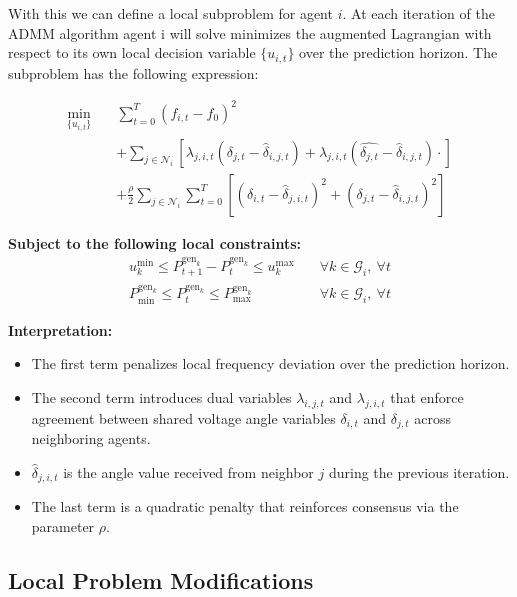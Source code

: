 \documentclass{article}
\begin{document}
With this we can define a local subproblem for agent $i$. At each iteration of the ADMM algorithm agent i will solve minimizes the augmented Lagrangian with respect to its own local decision variable $\{u_{i,t}\}$ over the prediction horizon. The subproblem has the following expression:

\begin{align}
    \min_{\{u_{i,t}\}} \quad & \sum_{t=0}^{T} (f_{i,t} - f_0)^2 \nonumber \\
    &+ \sum_{j \in \mathcal{N}_i} \left[ \lambda_{j,i,t}(\delta_{j,t} - \hat{\delta}_{i,j,t})  + \lambda_{j,i,t}(\hat{\delta_{j,t}} - \hat{\delta}_{i, j, t}) \cdot  \right] \nonumber \\
    &+ \frac{\rho}{2} \sum_{j \in \mathcal{N}_i} \sum_{t=0}^T \left[ (\delta_{i,t} - \hat{\delta}_{j,i,t})^2 + (\delta_{j,t} - \hat{\delta}_{i,j,t})^2 \right]
\end{align}

\textbf{Subject to the following local constraints:}
\begin{align}
    u^{\min}_k \leq P^{\text{gen}_k}_{t+1} - P^{\text{gen}_k}_t \leq u^{\max}_k \quad &\forall k \in \mathcal{G}_i,\ \forall t \\
    P^{\text{gen}_k}_{\min} \leq P^{\text{gen}_k}_t \leq P^{\text{gen}_k}_{\max} \quad &\forall k \in \mathcal{G}_i,\ \forall t
\end{align}

\textbf{Interpretation:}
\begin{itemize}
    \item The first term penalizes local frequency deviation over the prediction horizon.
    \item The second term introduces dual variables $\lambda_{i,j,t}$ and $\lambda_{j,i,t}$ that enforce agreement between shared voltage angle variables $\delta_{i,t}$ and $\delta_{j,t}$ across neighboring agents.
    \item $\hat{\delta}_{j,i,t}$ is the angle value received from neighbor $j$ during the previous iteration.
    \item The last term is a quadratic penalty that reinforces consensus via the parameter $\rho$.
\end{itemize}

\subsection*{Local Problem Modifications}
\end{document}
